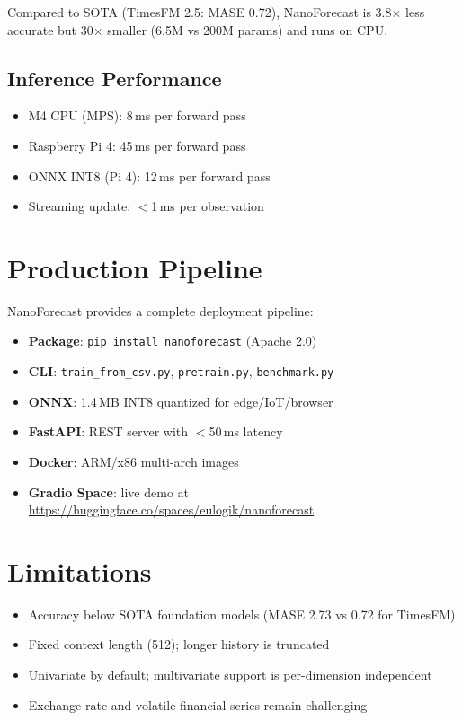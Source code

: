 \documentclass[11pt]{article}
\begin{document}
Compared to SOTA (TimesFM 2.5: MASE 0.72), NanoForecast is 3.8$\times$ less accurate but 30$\times$ smaller (6.5M vs 200M params) and runs on CPU.

\subsection{Inference Performance}
\begin{itemize}
    \item M4 CPU (MPS): 8\,ms per forward pass
    \item Raspberry Pi 4: 45\,ms per forward pass
    \item ONNX INT8 (Pi 4): 12\,ms per forward pass
    \item Streaming update: $<$1\,ms per observation
\end{itemize}

\section{Production Pipeline}

NanoForecast provides a complete deployment pipeline:
\begin{itemize}
    \item \textbf{Package}: \texttt{pip install nanoforecast} (Apache 2.0)
    \item \textbf{CLI}: \texttt{train\_from\_csv.py}, \texttt{pretrain.py}, \texttt{benchmark.py}
    \item \textbf{ONNX}: 1.4\,MB INT8 quantized for edge/IoT/browser
    \item \textbf{FastAPI}: REST server with $<$50\,ms latency
    \item \textbf{Docker}: ARM/x86 multi-arch images
    \item \textbf{Gradio Space}: live demo at \url{https://huggingface.co/spaces/eulogik/nanoforecast}
\end{itemize}

\section{Limitations}
\begin{itemize}
    \item Accuracy below SOTA foundation models (MASE 2.73 vs 0.72 for TimesFM)
    \item Fixed context length (512); longer history is truncated
    \item Univariate by default; multivariate support is per-dimension independent
    \item Exchange rate and volatile financial series remain challenging
\end{itemize}
\end{document}
